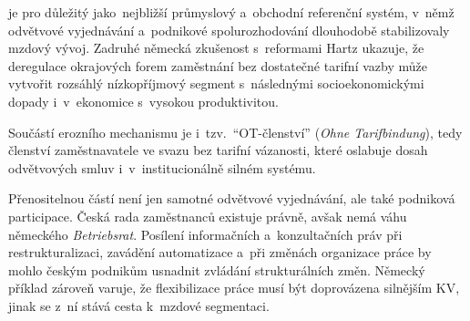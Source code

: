 je pro  důležitý jako~nejbližší průmyslový a~obchodní referenční systém, v~němž odvětvové vyjednávání a~podnikové spolurozhodování dlouhodobě stabilizovaly mzdový vývoj. Zadruhé německá zkušenost s~reformami Hartz ukazuje, že deregulace okrajových forem zaměstnání bez dostatečné tarifní vazby může vytvořit rozsáhlý nízkopříjmový segment s~následnými socioekonomickými dopady i~v~ekonomice s~vysokou produktivitou.~\cite{JdeToPruzne_PS2_NemeckyModel_2019}\par

Součástí erozního mechanismu je i~tzv.~\enquote{OT-členství} (\emph{Ohne Tarifbindung}), tedy členství zaměstnavatele ve svazu bez tarifní vázanosti, které oslabuje dosah odvětvových smluv i~v~institucionálně silném systému.~\cite{Hala_SystemySocialnihoDialogu2013}\par

Přenositelnou částí není jen samotné odvětvové vyjednávání, ale také podniková participace. Česká rada zaměstnanců existuje právně, avšak nemá váhu německého \textit{Betriebsrat}. Posílení informačních a~konzultačních práv při restrukturalizaci, zavádění automatizace a~při změnách organizace práce by mohlo českým podnikům usnadnit zvládání strukturálních změn. Německý příklad zároveň varuje, že flexibilizace práce musí být doprovázena silnějším \acs{KV}, jinak se z~ní stává cesta k~mzdové segmentaci.\par
